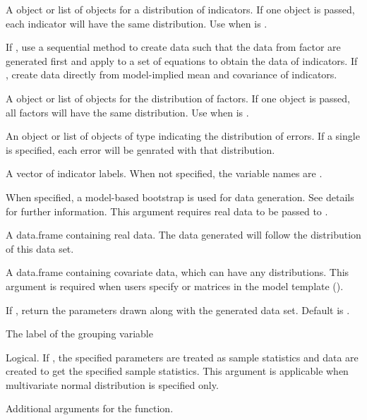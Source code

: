 \documentclass[a4paper]{book}
\begin{document}
\begin{Arguments}
\begin{ldescription}
\item[\code{indDist}]  
A  object or list of objects for a distribution of indicators. If one object is passed, each indicator will have the same distribution. Use when  is .

\item[\code{sequential}]  
If , use a sequential method to create data such that the data from factor are generated first and apply to a set of equations to obtain the data of indicators. If , create data directly from model-implied mean and covariance of indicators.

\item[\code{facDist}]  
A  object or list of objects for the distribution of factors. If one object is passed, all factors will have the same distribution. Use when  is .

\item[\code{errorDist}]  
An object or list of objects of type  indicating the distribution of errors. If a single  is specified, each error will be genrated with that distribution.

\item[\code{indLab}]  
A vector of indicator labels. When not specified, the variable names are .

\item[\code{modelBoot}]  
When specified, a model-based bootstrap is used for data generation. See details for further information. This argument requires real data to be passed to .

\item[\code{realData}]  
A data.frame containing real data. The data generated will follow the distribution of this data set.

\item[\code{covData}]  
A data.frame containing covariate data, which can have any distributions. This argument is required when users specify  or  matrices in the model template ().

\item[\code{params}]  
If , return the parameters drawn along with the generated data set. Default is .

\item[\code{group}]  
The label of the grouping variable

\item[\code{empirical}]  
Logical. If , the specified parameters are treated as sample statistics and data are created to get the specified sample statistics. This argument is applicable when multivariate normal distribution is specified only.

\item[\code{...}]  
Additional arguments for the  function. 

\end{ldescription}
\end{Arguments}
\end{document}
